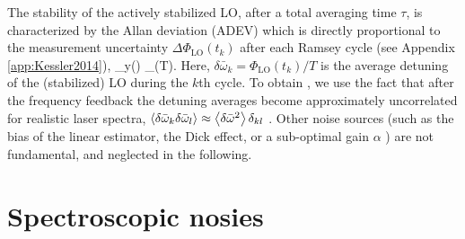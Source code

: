 The stability of the actively stabilized LO, after a total averaging time
$\tau$, is characterized by the Allan deviation (ADEV) which is directly
proportional to the measurement uncertainty $\Delta\Phi_\mathrm{LO}(t_k)$ after
each Ramsey cycle (see Appendix \ref{app:Kessler2014}),
\bel
	\label{eq:Allan-variance}
	\sigma_y(\tau) \equiv {}
	\approx
	  \Delta\Phi_(T).
\eel
Here, $\delta\bar\omega_k = \Phi_\mathrm{LO}(t_k)/T$ is the average detuning of the
(stabilized) LO during the $k$th cycle. {%
 To obtain , we use the fact that after the frequency
 feedback the detuning averages become approximately uncorrelated for realistic
 laser spectra, $\left< \delta\bar\omega_k \delta\bar\omega_l \right> \approx
 \left< \delta\bar\omega^2 \right>\delta_{kl}$ \cite{Borregaard2013,
 Andre2005,Bloom2013}}.
Other noise sources (such as the bias of the linear estimator, the Dick effect,
or a sub-optimal gain $\alpha$ \cite{Santarelli1998}) are not fundamental, and
neglected in the following.


\section{Spectroscopic nosies}

